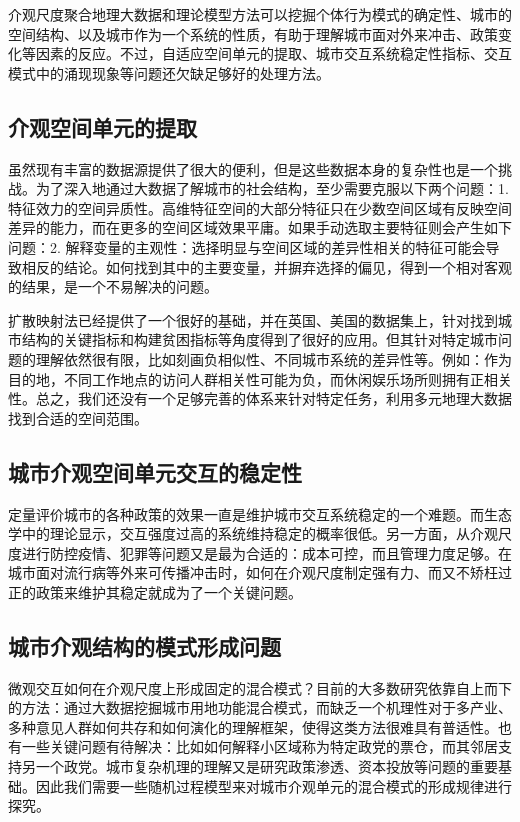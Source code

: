 介观尺度聚合地理大数据和理论模型方法可以挖掘个体行为模式的确定性、城市的空间结构、以及城市作为一个系统的性质，有助于理解城市面对外来冲击、政策变化等因素的反应。不过，自适应空间单元的提取、城市交互系统稳定性指标、交互模式中的涌现现象等问题还欠缺足够好的处理方法。

\subsection{介观空间单元的提取}

虽然现有丰富的数据源提供了很大的便利，但是这些数据本身的复杂性也是一个挑战。为了深入地通过大数据了解城市的社会结构，至少需要克服以下两个问题：1. 特征效力的空间异质性。高维特征空间的大部分特征只在少数空间区域有反映空间差异的能力，而在更多的空间区域效果平庸。如果手动选取主要特征则会产生如下问题：2. 解释变量的主观性：选择明显与空间区域的差异性相关的特征可能会导致相反的结论。如何找到其中的主要变量，并摒弃选择的偏见，得到一个相对客观的结果，是一个不易解决的问题。

扩散映射法已经提供了一个很好的基础，并在英国、美国的数据集上，针对找到城市结构的关键指标\cite{barter2019manifold}和构建贫困指标\cite{ghafourian2020mathematical}等角度得到了很好的应用。但其针对特定城市问题的理解依然很有限，比如刻画负相似性、不同城市系统的差异性等。例如：作为目的地，不同工作地点的访问人群相关性可能为负，而休闲娱乐场所则拥有正相关性。总之，我们还没有一个足够完善的体系来针对特定任务，利用多元地理大数据找到合适的空间范围。

\subsection{城市介观空间单元交互的稳定性}

定量评价城市的各种政策的效果一直是维护城市交互系统稳定的一个难题。而生态学中的理论显示\cite{may1972will}，交互强度过高的系统维持稳定的概率很低。另一方面，从介观尺度进行防控疫情、犯罪等问题又是最为合适的：成本可控，而且管理力度足够。在城市面对流行病等外来可传播冲击时，如何在介观尺度制定强有力、而又不矫枉过正的政策来维护其稳定就成为了一个关键问题。

\subsection{城市介观结构的模式形成问题}

微观交互如何在介观尺度上形成固定的混合模式？目前的大多数研究依靠自上而下的方法：通过大数据挖掘城市用地功能混合模式，而缺乏一个机理性对于多产业、多种意见人群如何共存和如何演化的理解框架，使得这类方法很难具有普适性。也有一些关键问题有待解决：比如如何解释小区域称为特定政党的票仓，而其邻居支持另一个政党。城市复杂机理的理解又是研究政策渗透、资本投放等问题的重要基础。因此我们需要一些随机过程模型来对城市介观单元的混合模式的形成规律进行探究。

